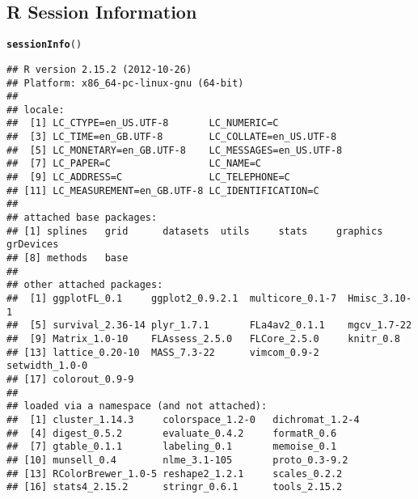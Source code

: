 \documentclass[a4paper]{article}\usepackage{graphicx, color}
\makeatletter
\newcommand{\hlfunctioncall}[1]{\textcolor[rgb]{0.501960784313725,0,0.329411764705882}{\textbf{#1}}}%
\newenvironment{kframe}{%
 \def\at@end@of@kframe{}%
 \ifinner\ifhmode%
  \def\at@end@of@kframe{\end{minipage}}%
  \begin{minipage}{\columnwidth}%
 \fi\fi%
 \def\FrameCommand##1{\hskip\@totalleftmargin \hskip-\fboxsep
 \colorbox{shadecolor}{##1}\hskip-\fboxsep
     \hskip-\linewidth \hskip-\@totalleftmargin \hskip\columnwidth}%
 \MakeFramed {\advance\hsize-\width
   \@totalleftmargin\z@ \linewidth\hsize
   \@setminipage}}%
 {\par\unskip\endMakeFramed%
 \at@end@of@kframe}
\newenvironment{knitrout}{}{} %
\makeatother
\begin{document}
\subsection*{R Session Information}
\begin{knitrout}
\color{fgcolor}\begin{kframe}
\begin{alltt}
\hlfunctioncall{sessionInfo}()
\end{alltt}
\begin{verbatim}
## R version 2.15.2 (2012-10-26)
## Platform: x86_64-pc-linux-gnu (64-bit)
## 
## locale:
##  [1] LC_CTYPE=en_US.UTF-8       LC_NUMERIC=C              
##  [3] LC_TIME=en_GB.UTF-8        LC_COLLATE=en_US.UTF-8    
##  [5] LC_MONETARY=en_GB.UTF-8    LC_MESSAGES=en_US.UTF-8   
##  [7] LC_PAPER=C                 LC_NAME=C                 
##  [9] LC_ADDRESS=C               LC_TELEPHONE=C            
## [11] LC_MEASUREMENT=en_GB.UTF-8 LC_IDENTIFICATION=C       
## 
## attached base packages:
## [1] splines   grid      datasets  utils     stats     graphics  grDevices
## [8] methods   base     
## 
## other attached packages:
##  [1] ggplotFL_0.1     ggplot2_0.9.2.1  multicore_0.1-7  Hmisc_3.10-1    
##  [5] survival_2.36-14 plyr_1.7.1       FLa4av2_0.1.1    mgcv_1.7-22     
##  [9] Matrix_1.0-10    FLAssess_2.5.0   FLCore_2.5.0     knitr_0.8       
## [13] lattice_0.20-10  MASS_7.3-22      vimcom_0.9-2     setwidth_1.0-0  
## [17] colorout_0.9-9  
## 
## loaded via a namespace (and not attached):
##  [1] cluster_1.14.3     colorspace_1.2-0   dichromat_1.2-4   
##  [4] digest_0.5.2       evaluate_0.4.2     formatR_0.6       
##  [7] gtable_0.1.1       labeling_0.1       memoise_0.1       
## [10] munsell_0.4        nlme_3.1-105       proto_0.3-9.2     
## [13] RColorBrewer_1.0-5 reshape2_1.2.1     scales_0.2.2      
## [16] stats4_2.15.2      stringr_0.6.1      tools_2.15.2
\end{verbatim}
\end{kframe}
\end{knitrout}
\end{document}
